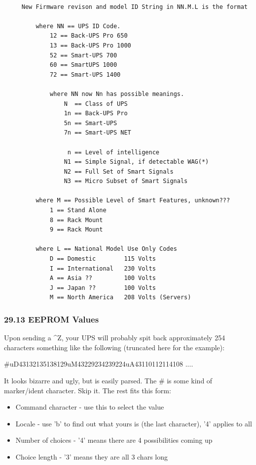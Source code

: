\footnotesize
\begin{verbatim}
     
     New Firmware revison and model ID String in NN.M.L is the format
     
         where NN == UPS ID Code.
             12 == Back-UPS Pro 650
             13 == Back-UPS Pro 1000
             52 == Smart-UPS 700
             60 == SmartUPS 1000
             72 == Smart-UPS 1400
     
             where NN now Nn has possible meanings.
                 N  == Class of UPS
                 1n == Back-UPS Pro
                 5n == Smart-UPS
                 7n == Smart-UPS NET
     
                  n == Level of intelligence
                 N1 == Simple Signal, if detectable WAG(*)
                 N2 == Full Set of Smart Signals
                 N3 == Micro Subset of Smart Signals
     
         where M == Possible Level of Smart Features, unknown???
             1 == Stand Alone
             8 == Rack Mount
             9 == Rack Mount
     
         where L == National Model Use Only Codes
             D == Domestic        115 Volts
             I == International   230 Volts
             A == Asia ??         100 Volts
             J == Japan ??        100 Volts
             M == North America   208 Volts (Servers)
\end{verbatim}
\normalsize

\label{EEPROM-Values}

\subsubsection*{29.13 EEPROM Values}

Upon sending a \^{}Z, your UPS will probably spit back approximately 254
characters something like the following (truncated here for the example):  

\#uD43132135138129uM43229234239224uA43110112114108 ....  

It looks bizarre and ugly, but is easily parsed. The \# is some kind of
marker/ident character. Skip it. The rest fits this form:  

\begin{itemize}
\item Command character - use this to select the value  
\item Locale - use 'b' to find out what yours is (the last character), '4'
applies to all  
\item Number of choices - '4' means there are 4 possibilities coming up  
\item Choice length - '3' means they are all 3 chars long 
\end{itemize}

